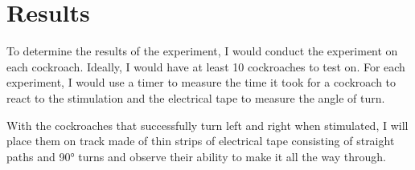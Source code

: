 \section{Results}


To determine the results of the experiment, I would conduct the experiment on each cockroach. Ideally, I would have at least 10 cockroaches to test on. For each experiment, I would use a timer to measure the time it took for a cockroach to react to the stimulation and the electrical tape to measure the angle of turn. 

\bigskip

With the cockroaches that successfully turn left and right when stimulated, I will place them on track made of thin strips of electrical tape consisting of straight paths and \ang{90} turns and observe their ability to make it all the way through.


